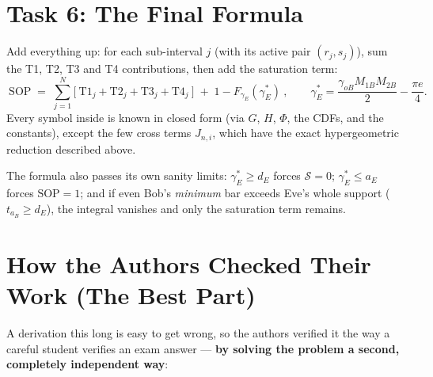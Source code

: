 \documentclass[11pt]{article}
\begin{document}
\section{Task 6: The Final Formula}

Add everything up: for each sub-interval $j$ (with its active pair $(r_j,s_j)$), sum
the T1, T2, T3 and T4 contributions, then add the saturation term:
\[
\boxed{\ \mathrm{SOP} \;=\; \sum_{j=1}^{N}\Big[\ \text{T1}_j + \text{T2}_j + \text{T3}_j + \text{T4}_j\ \Big]
\;+\; 1 - F_{\gamma_E}(\gamma_E^{*})\ },
\qquad
\gamma_E^{*}=\frac{\gamma_{oB}M_{1B}M_{2B}}{2}-\frac{\pi e}{4}.
\]
Every symbol inside is known in closed form (via $G$, $H$, $\Phi$, the CDFs, and the
constants), except the few cross terms $J_{n,i}$, which have the exact hypergeometric
reduction described above.

The formula also passes its own sanity limits: $\gamma_E^{*}\ge d_E$ forces
$\mathcal S = 0$; $\gamma_E^{*}\le a_E$ forces $\mathrm{SOP}=1$; and if even Bob's
\emph{minimum} bar exceeds Eve's whole support ($t_{a_B}\ge d_E$), the integral
vanishes and only the saturation term remains.

\section{How the Authors Checked Their Work (The Best Part)}

A derivation this long is easy to get wrong, so the authors verified it the way a
careful student verifies an exam answer --- \textbf{by solving the problem a second,
completely independent way}:

\begin{center}
\end{center}
\end{document}
